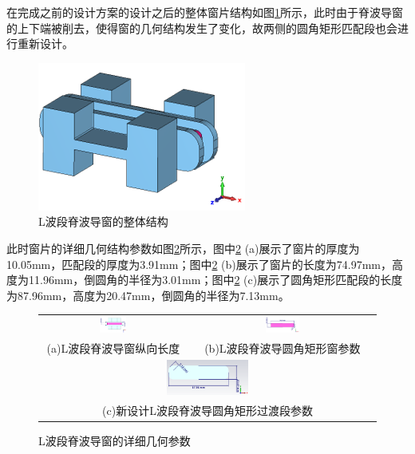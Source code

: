 \documentclass[master]{thesis-uestc}
\begin{document}
在完成之前的设计方案的设计之后的整体窗片结构如图\ref{fig:L波段脊波导窗的整体结构}所示，此时由于脊波导窗的上下端被削去，使得窗的几何结构发生了变化，故两侧的圆角矩形匹配段也会进行重新设计。

\begin{figure}[!htb]
    \centering
    \includegraphics[width=0.3\linewidth]{pic/chapter4/L波段脊波导窗整体结构.png}
    \caption{L波段脊波导窗的整体结构}
    \label{fig:L波段脊波导窗的整体结构}
\end{figure}

此时窗片的详细几何结构参数如图\ref{fig:L波段脊波导窗的详细几何参数}所示，图中\ref{fig:L波段脊波导窗的详细几何参数} (a)展示了窗片的厚度为10.05mm，匹配段的厚度为3.91mm；图中\ref{fig:L波段脊波导窗的详细几何参数} (b)展示了窗片的长度为74.97mm，高度为11.96mm，倒圆角的半径为3.01mm；图中\ref{fig:L波段脊波导窗的详细几何参数} (c)展示了圆角矩形匹配段的长度为87.96mm，高度为20.47mm，倒圆角的半径为7.13mm。
\begin{figure}[!htb]
    \small
    \centering
    \begin{tabular}{@{\ }c@{\ }c}
        \includegraphics[width=0.19\textwidth]{pic/chapter4/L波段脊波导窗纵向长度.png} & 
        \hspace{5pt}
        \includegraphics[width=0.19\textwidth]{pic/chapter4/L波段圆角矩形窗片尺寸.png}     \\
        \mbox{\small (a)L波段脊波导窗纵向长度}                                                                               & 
        \mbox{\small (b)L波段脊波导圆角矩形窗参数}                                                           \\[6bp]
        \multicolumn{2}{c}{\includegraphics[width=0.25\textwidth]{pic/chapter4/L波段过渡段尺寸.png}} \\  %
        \multicolumn{2}{c}{\mbox{\small (c)新设计L波段脊波导圆角矩形过渡段参数}}             
    \end{tabular}
    \caption{L波段脊波导窗的详细几何参数}
    \label{fig:L波段脊波导窗的详细几何参数}
\end{figure}
\end{document}
